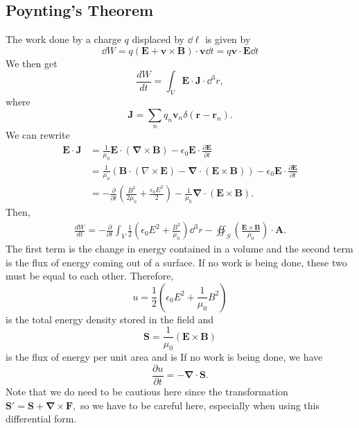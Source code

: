 \documentclass{article}
\numberwithin{equation}{section}
\begin{document}
\subsection{Poynting's Theorem}
The work done by a charge $q$ displaced by $\dd{\bm{\ell}}$ is given by 
\begin{equation}
    \dd{W} = q(\bm{E}+\bm{v}\times\bm{B}) \cdot \bm{v} \dd{t} = q\bm{v}\cdot \bm{E} \dd{t}
\end{equation}
We then get 
\begin{equation}
    \frac{dW}{dt} = \int_{V} \bm{E} \cdot \bm{J} \cdot \dd^3{r},
\end{equation}
where 
\begin{equation}
    \bm{J} = \sum_n q_n \bm{v}_n \delta(\bm{r}-\bm{r}_n).
\end{equation}
We can rewrite 
\begin{align}
    \bm{E} \cdot \bm{J} &= \frac{1}{\mu_0} \bm{E} \cdot (\bm{\nabla} \times \bm{B}) - \epsilon_0 \bm{E} \cdot \frac{\partial \bm{E}}{\partial t} \\ 
    &= \frac{1}{\mu_0}\left(\bm{B}\cdot (\nabla\times \bm{E}) - \bm{\nabla}\cdot (\bm{E}\times \bm{B})\right) - \epsilon_0 \bm{E} \cdot \frac{\partial \bm{E}}{\partial t} \\ 
    &= -\frac{\partial}{\partial t}\left(\frac{B^2}{2\mu_0}+\frac{\epsilon_0 E^2}{2}\right) - \frac{1}{\mu_0}\bm{\nabla}\cdot (\bm{E}\times \bm{B}).
\end{align}
Then,
\begin{align}
    \frac{dW}{dt} = -\frac{\partial}{\partial t}\int_V \frac{1}{2}\left(\epsilon_0 E^2 + \frac{B^2}{\mu_0}\right) \dd^3{r} - \oiint_{S} \left(\frac{\bm{E}\times \bm{B}}{\mu_0}\right) \cdot \bm{A}.
\end{align}
The first term is the change in energy contained in a volume and the second term is the flux of energy coming out of a surface. If no work is being done, these two must be equal to each other. Therefore,
\begin{equation}
    u = \frac{1}{2}(\epsilon_0 E^2 + \frac{1}{\mu_0}B^2)
\end{equation}
is the total energy density stored in the field and 
\begin{equation}
    \bm{S} = \frac{1}{\mu_0}(\bm{E} \times \bm{B})
\end{equation}
is the flux of energy per unit area and is  If no work is being done, we have 
\begin{equation}
    \boxed{\frac{\partial u}{\partial t} = - \bm{\nabla}\cdot \bm{S}.}
\end{equation}
Note that we do need to be cautious here since the transformation $\bm{S}' = \bm{S} + \bm{\nabla}\times \bm{F},$ so we have to be careful here, especially when using this differential form.
\end{document}
